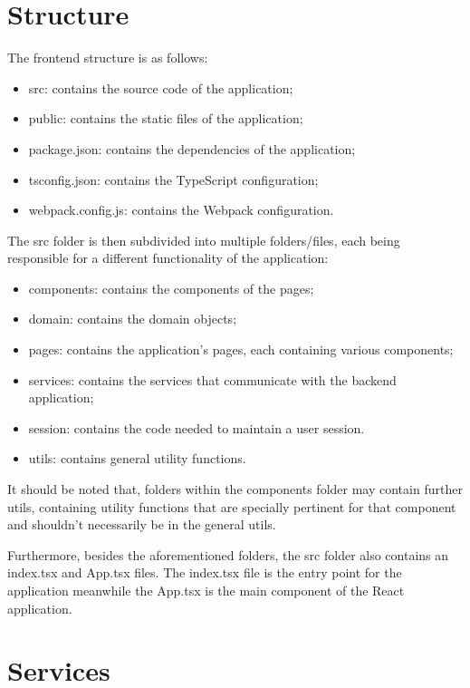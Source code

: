 \newpage

\section{Structure}

The frontend structure is as follows:

\begin{itemize}
	\item src: contains the source code of the application;
	\item public: contains the static files of the application;
	\item package.json:  contains the dependencies of the application;
	\item tsconfig.json: contains the TypeScript configuration;
	\item webpack.config.js:  contains the Webpack configuration.
\end{itemize}

The src folder is then subdivided into multiple folders/files, each being responsible for a different functionality of the application:

\begin{itemize}
	\item components: contains the components of the pages;
	\item domain: contains the domain objects;
	\item pages:  contains the application's pages, each containing various components;
	\item services: contains the services that communicate with the backend application;
	\item session: contains the code needed to maintain a user session.
	\item utils:  contains general utility functions.
\end{itemize}

It should be noted that, folders within the components folder may contain further utils, containing utility functions that are specially pertinent for that component and shouldn't necessarily be in the general utils. 

Furthermore, besides the aforementioned folders, the src folder also contains an index.tsx and App.tsx files. The index.tsx file is the entry point for the application meanwhile the App.tsx is the main component of the React application.


\section{Services}

